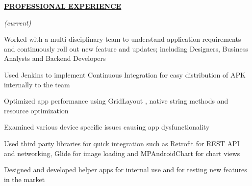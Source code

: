 \documentclass[a4paper]{deedy-resume} %
\begin{document}
\sectionspace

{\uppercase\uline{\textbf{\large{Professional Experience}}\hfill}}
\microspace

\hfill {\textit{\small(current)}}\\

\begin{tightitemize}
\item Worked with a multi-disciplinary team to understand application requirements and continuously roll out new feature and updates; including Designers, Business Analysts and Backend Developers
\item Used Jenkins to implement Continuous Integration for easy distribution of APK internally to the team
\item Optimized app performance using GridLayout , native string methods and resource optimization
\item Examined various device specific issues causing app dysfunctionality
\item Used third party libraries for quick integration such as Retrofit for REST API and networking, Glide for image loading and MPAndroidChart for chart views
\item Designed and developed helper apps for internal use and for testing new features in the market 
\end{tightitemize}
\microspace
\end{document}
